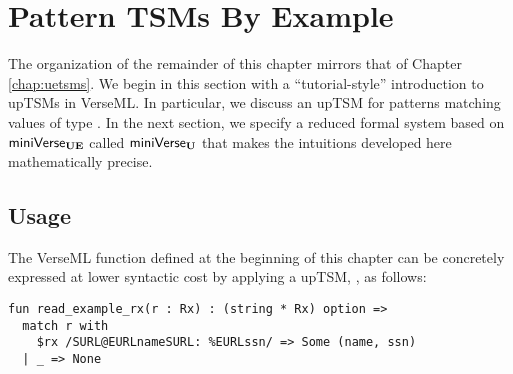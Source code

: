 \section{Pattern TSMs By Example}\label{sec:ptsms-by-example}
The organization of the remainder of this chapter mirrors that of Chapter \ref{chap:uetsms}. We begin in this section with a ``tutorial-style'' introduction to upTSMs in VerseML. In particular, we  discuss an upTSM for patterns matching values of type . In the next section, we specify a reduced formal system based on $\mathsf{miniVerse}_\textbf{UE}$ called $\mathsf{miniVerse}_\textbf{U}$ that makes the intuitions developed here mathematically precise.

\subsection{Usage}\label{sec:ptsms-usage}
The VerseML function  defined at the beginning of this chapter can be concretely expressed at lower syntactic cost by applying a upTSM, , as follows:
\begin{lstlisting}
fun read_example_rx(r : Rx) : (string * Rx) option => 
  match r with 
    $rx /SURL@EURLnameSURL: %EURLssn/ => Some (name, ssn)
  | _ => None
\end{lstlisting}
